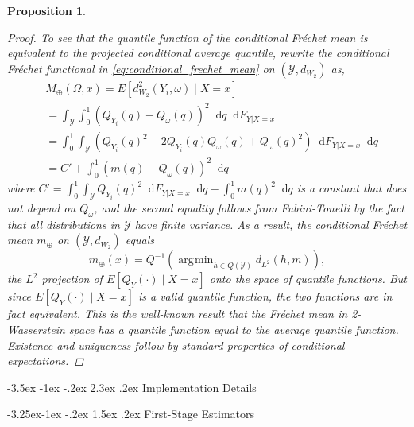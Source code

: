 \documentclass[12pt]{article}
\makeatletter
\renewcommand\section{\@startsection{section}{1}{\z@}%
  {-3.5ex \@plus -1ex \@minus -.2ex}%
  {2.3ex \@plus.2ex}%
  {\bfseries\large\center}} %
\renewcommand\subsection{\@startsection{subsection}{2}{\z@}%
  {-3.25ex\@plus -1ex \@minus -.2ex}%
  {1.5ex \@plus .2ex}%
  {\itshape\large\center}} %
\newcommand*\dd{\mathop{}\!\mathrm{d}}
\newtheorem{proposition}{Proposition}
\DeclareMathOperator*{\argmin}{\arg\!\min}
\makeatother
\begin{document}
\begin{proposition}
\begin{proof}
To see that the quantile function of the conditional Fr\'echet mean is equivalent to the projected conditional average quantile, rewrite the conditional Fr\'echet functional in \eqref{eq:conditional_frechet_mean} on $(
\mathcal{Y}, d_{W_2})$ as,
\begin{align*}
& M_{\oplus}(\Omega, x) = E[ d_{W_2}^2(Y_i, \omega) \mid X=x] \\
& = \int_{\mathcal{Y}} \int_{0}^1 \left( Q_{Y_i}(q) - Q_{\omega}(q) \right)^2 \dd q \dd F_{Y|X=x} \\ 
& =   \int_{0}^1  \int_{\mathcal{Y}} \left( Q_{Y_i}(q)^2 - 2 Q_{Y_i}(q) Q_{\omega}(q)  +  Q_{\omega}(q)^2 \right) \dd F_{Y|X=x} \dd q \\ 
& = C' + \int_{0}^1 \left( m(q) - Q_\omega(q) \right)^2 \dd q
\end{align*}
where $C' = \int_{0}^1  \int_{\mathcal{Y}}  Q_{Y_i}(q)^2 \dd F_{Y|X=x} \dd q - \int_0^1 m(q)^2 \dd q $ is a constant that does not depend on $Q_\omega$, and the second equality follows from Fubini-Tonelli by the fact that all distributions in $\mathcal{Y}$ have finite variance. As a result, the conditional Fr\'echet mean $m_{\oplus}$ on $(\mathcal{Y}, d_{W_2})$ equals
\[
m_{\oplus}(x) = Q^{-1}\left( \argmin_{h \in Q(\mathcal{Y})} d_{L^2}(h, m) \right),
\]
the $L^2$ projection of $E[Q_Y(\cdot) \mid X=x]$ onto the space of quantile functions. But since $E[Q_Y(\cdot) \mid X=x]$ is a valid quantile function, the two functions are in fact equivalent. This is the well-known result that the Fr\'echet mean in 2-Wasserstein space has a quantile function equal to the average quantile function. Existence and uniqueness  follow by standard properties of conditional expectations.
 \end{proof}
\end{proposition}


\section{Implementation Details}

\subsection{First-Stage Estimators} \label{app:first_stage}
\end{document}
